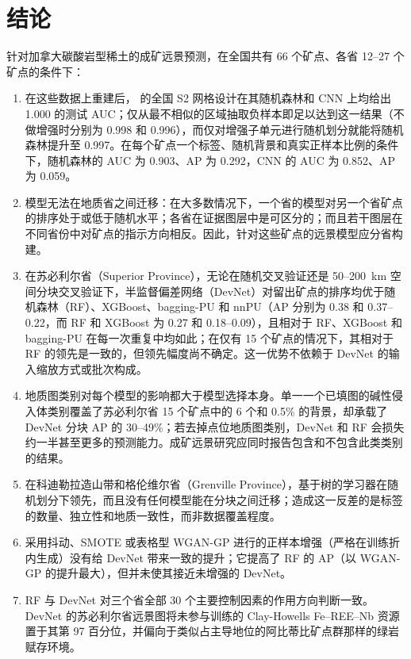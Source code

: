 \documentclass[pdflatex,sn-apa]{sn-jnl}
\begin{document}
\section{结论}\label{sec:conclusions}

针对加拿大碳酸岩型稀土的成矿远景预测，在全国共有 66 个矿点、各省 12--27 个矿点的条件下：
\begin{enumerate}
\item 在这些数据上重建后，\citet{Parsa2024} 的全国 S2 网格设计在其随机森林和 CNN 上均给出 1.000 的测试 AUC；仅从最不相似的区域抽取负样本即足以达到这一结果（不做增强时分别为 0.998 和 0.996），而仅对增强子单元进行随机划分就能将随机森林提升至 0.997。在每个矿点一个标签、随机背景和真实正样本比例的条件下，随机森林的 AUC 为 0.903、AP 为 0.292，CNN 的 AUC 为 0.852、AP 为 0.059。
\item 模型无法在地质省之间迁移：在大多数情况下，一个省的模型对另一个省矿点的排序处于或低于随机水平；各省在证据图层中是可区分的；而且若干图层在不同省份中对矿点的指示方向相反。因此，针对这些矿点的远景模型应分省构建。
\item 在苏必利尔省（Superior Province），无论在随机交叉验证还是 50--200~km 空间分块交叉验证下，半监督偏差网络（DevNet）对留出矿点的排序均优于随机森林（RF）、XGBoost、bagging-PU 和 nnPU（AP 分别为 0.38 和 0.37--0.22，而 RF 和 XGBoost 为 0.27 和 0.18--0.09），且相对于 RF、XGBoost 和 bagging-PU 在每一次重复中均如此；在仅有 15 个矿点的情况下，其相对于 RF 的领先是一致的，但领先幅度尚不确定。这一优势不依赖于 DevNet 的输入缩放方式或批次构成。
\item 地质图类别对每个模型的影响都大于模型选择本身。单一一个已填图的碱性侵入体类别覆盖了苏必利尔省 15 个矿点中的 6 个和 0.5\% 的背景，却承载了 DevNet 分块 AP 的 30--49\%；若去掉点位地质图类别，DevNet 和 RF 会损失约一半甚至更多的预测能力。成矿远景研究应同时报告包含和不包含此类类别的结果。
\item 在科迪勒拉造山带和格伦维尔省（Grenville Province），基于树的学习器在随机划分下领先，而且没有任何模型能在分块之间迁移；造成这一反差的是标签的数量、独立性和地质一致性，而非数据覆盖程度。
\item 采用抖动、SMOTE 或表格型 WGAN-GP 进行的正样本增强（严格在训练折内生成）没有给 DevNet 带来一致的提升；它提高了 RF 的 AP（以 WGAN-GP 的提升最大），但并未使其接近未增强的 DevNet。
\item RF 与 DevNet 对三个省全部 30 个主要控制因素的作用方向判断一致。DevNet 的苏必利尔省远景图将未参与训练的 Clay-Howells Fe--REE--Nb 资源置于其第 97 百分位，并偏向于类似占主导地位的阿比蒂比矿点群那样的绿岩赋存环境。
\end{enumerate}
\end{document}
